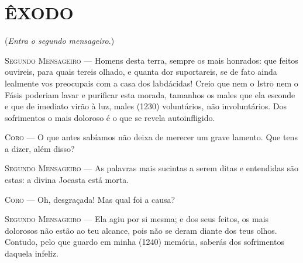 \section{ÊXODO}

(\emph{Entra o segundo mensageiro}.)

\textsc{Segundo Mensageiro} --- Homens desta terra, sempre os mais honrados: que feitos ouvireis, para
quais tereis olhado, e quanta dor suportareis, se de fato ainda lealmente
vos preocupais com a casa dos labdácidas! Creio que nem o Istro nem o
Fásis poderiam lavar e purificar esta morada, tamanhos os males que ela
esconde e que de imediato virão à luz, males (1230) voluntários, não
involuntários. Dos sofrimentos o mais doloroso é o que se revela
autoinfligido.

\textsc{Coro} --- O que antes sabíamos não deixa de merecer um grave lamento. Que tens a
dizer, além disso?

\textsc{Segundo Mensageiro} --- As palavras mais sucintas a serem ditas e entendidas são estas: a divina
Jocasta está morta.

\textsc{Coro} --- Oh, desgraçada! Mas qual foi a causa?

\textsc{Segundo Mensageiro} --- Ela agiu por si mesma; e dos seus feitos, os mais dolorosos não estão ao
teu alcance, pois não se deram diante dos teus olhos. Contudo, pelo que
guardo em minha (1240) memória, saberás dos sofrimentos daquela infeliz.

